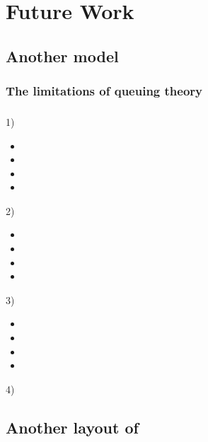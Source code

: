 \documentclass{tzmcmthesis}
\begin{document}
\section{Future Work}
\subsection{Another model}
\subsubsection{The limitations of queuing theory}




\subsubsection{}


\subsubsection{}



\subsubsection{}


1)
\begin{itemize}
\item 	
\item
\item
\item
\end{itemize}
2)
\begin{itemize}
\item 	
\item
\item
\item
\end{itemize}
3)

\begin{itemize}
\item 	
\item
\item
\item
\end{itemize}
4)



\subsection{Another layout of}
\end{document}

